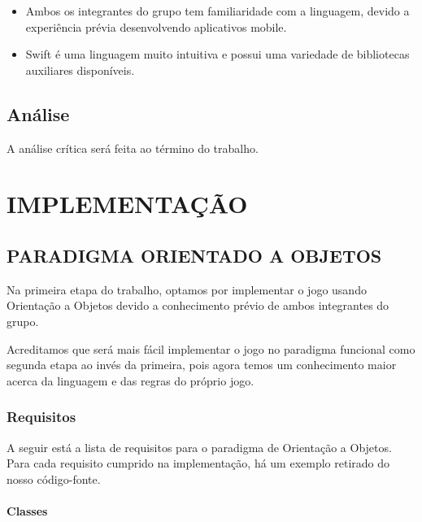 \documentclass[rel_mlp]{iiufrgs}
\begin{document}
\begin{itemize}[leftmargin=3em]
\setlength{\itemindent}{1em}

    \item Ambos os integrantes do grupo tem familiaridade com a linguagem, devido a experiência prévia desenvolvendo aplicativos mobile.

    \item Swift é uma linguagem muito intuitiva e possui uma variedade de bibliotecas auxiliares disponíveis.

\end{itemize}

\section{Análise}

A análise crítica será feita ao término do trabalho.


\chapter{IMPLEMENTAÇÃO} \label{intro}

\section{PARADIGMA ORIENTADO A OBJETOS} \label{intro}

Na primeira etapa do trabalho, optamos por implementar o jogo usando Orientação a Objetos devido a conhecimento prévio de ambos integrantes do grupo.

Acreditamos que será mais fácil implementar o jogo no paradigma funcional como segunda etapa ao invés da primeira, pois agora temos um conhecimento maior acerca da linguagem e das regras do próprio jogo.

\subsection{Requisitos}

A seguir está a lista de requisitos para o paradigma de Orientação a Objetos. Para cada requisito cumprido na implementação, há um exemplo retirado do nosso código-fonte.

\subsubsection{Classes}
\end{document}

